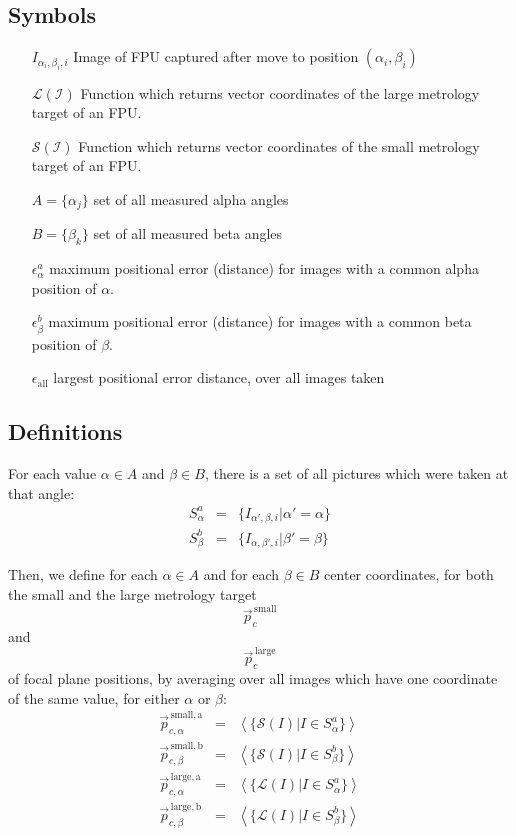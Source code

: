 \documentclass[11pt,a4paper]{scrartcl}
\begin{document}
\subsection{Symbols}
\begin{itemize}
  \item[]
\item[$I_{\alpha_i,\beta_i,i}$] Image of FPU captured after move to position $(\alpha_i,\beta_i)$
\item[$\mathcal{L(I)}$] Function which returns vector coordinates of
  the large metrology target of an FPU.
\item[$\mathcal{S(I)}$] Function which returns vector coordinates of
  the small metrology target of an FPU.
\item[$A = \{ \alpha_j\}$] set of all measured alpha angles
\item[$B = \{ \beta_k\}$] set of all measured beta angles
  \item[$\epsilon^{a}_\alpha$] maximum positional error (distance) for images with a common
    alpha position of $\alpha$.
  \item[$\epsilon^{b}_\beta$] maximum positional error (distance) for images with a common
    beta position of $\beta$.
    \item[$\epsilon_\mathrm{all}$] largest positional error distance,
      over all images taken
\end{itemize}

\subsection{Definitions}
For each value $\alpha \in A$ and $\beta \in B$, there is a set of all
pictures which were taken at that angle:
\begin{eqnarray}
  S^a_\alpha & = &  \{ I_{\alpha',\beta,i} | \alpha' = \alpha \} \\
  S^b_\beta & = &  \{ I_{\alpha,\beta',i} | \beta' = \beta \}
\end{eqnarray}

Then, we define for each $\alpha \in A$ and for each $\beta \in B$
center coordinates, for both the small and the large metrology target
\[
\vec{p}_c^\mathrm{\,small}
\] and
\[
\vec{p}_c^\mathrm{\,large}
\]
of focal plane positions, by averaging over all images which have
one coordinate of the same value, for either $\alpha$ or $\beta$:
\begin{eqnarray}
  \vec{p}_{c,\alpha}^\mathrm{\,small,a} & = &  \left< \{ \mathcal{S}(I) | I \in S^a_\alpha  \} \right> \\
  \vec{p}_{c,\beta}^\mathrm{\,small,b}  & = &  \left< \{ \mathcal{S}(I) | I \in S^b_\beta \} \right> \\
  \vec{p}_{c,\alpha}^\mathrm{\,large,a} & = &  \left< \{ \mathcal{L}(I) | I \in S^a_\alpha \} \right> \\
  \vec{p}_{c,\beta}^\mathrm{\,large,b}  & = &  \left< \{ \mathcal{L}(I) | I \in S^b_\beta \} \right>
\end{eqnarray}
\end{document}
